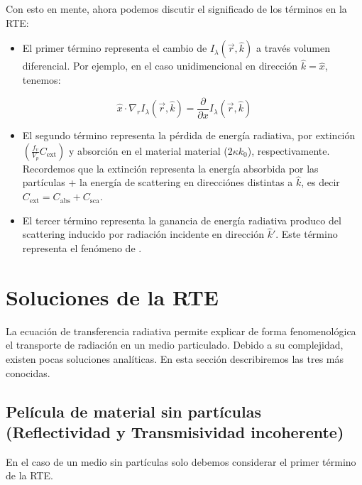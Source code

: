 \documentclass[letterpaper,10pt,english]{jupyterBook}
\begin{document}
\sphinxAtStartPar
Con esto en mente, ahora podemos discutir el significado de los términos en la RTE:
\begin{itemize}
\item {} 
\sphinxAtStartPar
El primer término representa el cambio de \(I_\lambda(\vec{r},\hat{k})\) a través volumen diferencial. Por ejemplo, en el caso unidimencional en dirección \(\hat{k} = \hat{x}\), tenemos:

\end{itemize}
\begin{equation*}
\hat{x}\cdot\nabla_r I_\lambda(\vec{r},\hat{k}) = \frac{\partial}{\partial x}I_\lambda(\vec{r},\hat{k})
\end{equation*}\begin{itemize}
\item {} 
\sphinxAtStartPar
El segundo término representa la pérdida de energía radiativa, por extinción \(\left(\frac{f_v}{V_p}C_\mathrm{ext}\right)\) y absorción en el material material (\(2\kappa k_0\)), respectivamente. Recordemos que la extinción representa la energía absorbida por las partículas + la energía de scattering en direcciónes distintas a \(\hat{k}\), es decir \(C_\mathrm{ext}= C_\mathrm{abs} + C_\mathrm{sca}\).

\end{itemize}
\begin{itemize}
\item {} 
\sphinxAtStartPar
El tercer término representa la ganancia de energía radiativa produco del scattering inducido por radiación incidente en dirección \(\hat{k}'\). Este término representa el fenómeno de .

\end{itemize}


\section{Soluciones de la RTE}
\label{\detokenize{5_TransporteRadiativo/5_TransporteRadiativo:soluciones-de-la-rte}}
\sphinxAtStartPar
La ecuación de transferencia radiativa permite explicar de forma fenomenológica el transporte de radiación en un medio particulado. Debido a su complejidad, existen pocas soluciones analíticas. En esta sección describiremos las tres más conocidas.


\subsection{Película de material sin partículas (Reflectividad y Transmisividad incoherente)}
\label{\detokenize{5_TransporteRadiativo/5_TransporteRadiativo:pelicula-de-material-sin-particulas-reflectividad-y-transmisividad-incoherente}}
\sphinxAtStartPar
En el caso de un medio sin partículas solo debemos considerar el primer término de la RTE.
\end{document}
